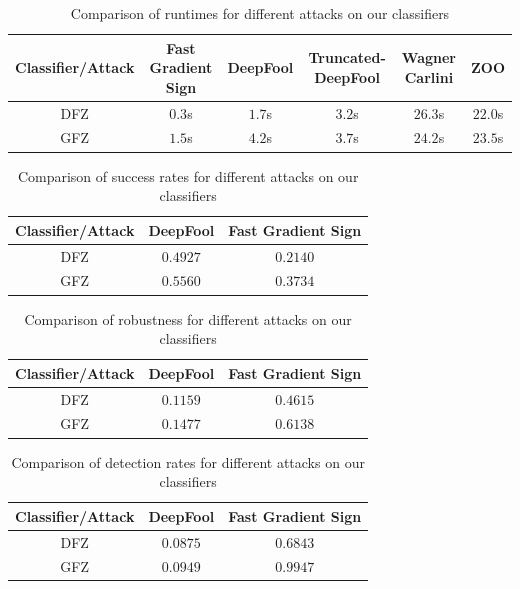 \documentclass[11pt,twocolumn,letterpaper]{article}
\begin{document}
\begin{table}[ht]
    \centering
    \begin{tabular}{|c|c|c|c|c|c|}
        \hline
        \textbf{Classifier/Attack} & \textbf{Fast Gradient Sign} & \textbf{DeepFool} & \textbf{Truncated-DeepFool} & \textbf{Wagner Carlini} & \textbf{ZOO} \\
        \hline
        DFZ & $0.3$s & $1.7$s & $3.2$s & $26.3$s & $22.0$s \\
        \hline
        GFZ & $1.5$s & $4.2$s & $3.7$s & $24.2$s & $23.5$s \\
        \hline
    \end{tabular}
    \caption{Comparison of runtimes for different attacks on our classifiers}
    \label{tab:runtimes}
\end{table}

\begin{table}[ht]
    \centering
    \begin{tabular}{|c|c|c|}
        \hline
        \textbf{Classifier/Attack} & \textbf{DeepFool} & \textbf{Fast Gradient Sign} \\
        \hline
        DFZ & $0.4927$ & $0.2140$ \\
        \hline
        GFZ & $0.5560$ & $0.3734$ \\
        \hline
    \end{tabular}
    \caption{Comparison of success rates for different attacks on our classifiers}
    \label{tab:success_rates}
\end{table}

\begin{table}[ht]
    \centering
    \begin{tabular}{|c|c|c|}
        \hline
        \textbf{Classifier/Attack} & \textbf{DeepFool} & \textbf{Fast Gradient Sign} \\
        \hline
        DFZ & $0.1159$ & $0.4615$ \\
        \hline
        GFZ & $0.1477$ & $0.6138$ \\
        \hline
    \end{tabular}
    \caption{Comparison of robustness for different attacks on our classifiers}
    \label{tab:perturbation_norms}
\end{table}

\begin{table}[ht]
    \centering
    \begin{tabular}{|c|c|c|}
        \hline
        \textbf{Classifier/Attack} & \textbf{DeepFool} & \textbf{Fast Gradient Sign} \\
        \hline
        DFZ & $0.0875$ & $0.6843$ \\
        \hline
        GFZ & $0.0949$ & $0.9947$ \\
        \hline
    \end{tabular}
    \caption{Comparison of detection rates for different attacks on our classifiers}
    \label{tab:detection_rates}
\end{table}
\end{document}
